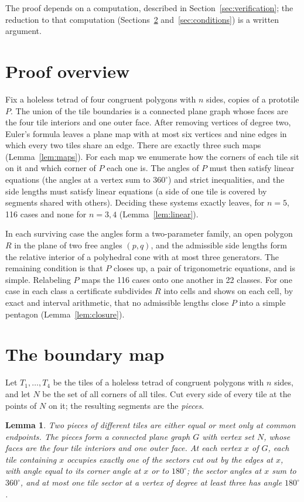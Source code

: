\documentclass[11pt]{article}
\newtheorem{lemma}[theorem]{Lemma}
\theoremstyle{definition}
\theoremstyle{remark}
\begin{document}
The proof depends on a computation, described in
Section~\ref{sec:verification}; the reduction to that computation
(Sections~\ref{sec:maps} and~\ref{sec:conditions}) is a written argument.

\section{Proof overview}

Fix a holeless tetrad of four congruent polygons with $n$ sides, copies of
a prototile $P$. The union of the tile boundaries is a connected plane graph
whose faces are the four tile interiors and one outer face. After removing
vertices of degree two, Euler's formula leaves a plane map with at most six
vertices and nine edges in which every two tiles share an edge. There are
exactly three such maps (Lemma~\ref{lem:maps}). For each map we enumerate
how the corners of each tile sit on it and which corner of $P$ each one is.
The angles of $P$ must then satisfy linear equations (the angles at a
vertex sum to $360^\circ$) and strict inequalities, and the side lengths
must satisfy linear equations (a side of one tile is covered by segments
shared with others). Deciding these systems exactly leaves, for $n=5$,
116 cases and none for $n=3,4$ (Lemma~\ref{lem:linear}).

In each surviving case the angles form a two-parameter family, an open
polygon $R$ in the plane of two free angles $(p,q)$, and the admissible side
lengths form the relative interior of a polyhedral cone with at most three
generators. The remaining condition is that $P$ closes up, a pair of
trigonometric equations, and is simple. Relabeling $P$ maps the 116 cases
onto one another in 22 classes. For one case in each class a certificate
subdivides $R$ into cells and shows on each cell, by exact and interval
arithmetic, that no admissible lengths close $P$ into a simple pentagon
(Lemma~\ref{lem:closure}).

\section{The boundary map}\label{sec:maps}

Let $T_1,\dots,T_4$ be the tiles of a holeless tetrad of congruent polygons
with $n$ sides, and let $N$ be the set of all corners of all tiles. Cut every
side of every tile at the points of $N$ on it; the resulting segments are
the \emph{pieces}.

\begin{lemma}\label{lem:graph}
Two pieces of different tiles are either equal or meet only at common
endpoints. The pieces form a connected plane graph $G$ with vertex set $N$,
whose faces are the four tile interiors and one outer face. At each vertex
$x$ of $G$, each tile containing $x$ occupies exactly one of the sectors
cut out by the edges at $x$, with angle equal to its corner angle at $x$ or
to $180^\circ$; the sector angles at $x$ sum to $360^\circ$, and at most one
tile sector at a vertex of degree at least three has angle $180^\circ$.
\end{lemma}
\end{document}

